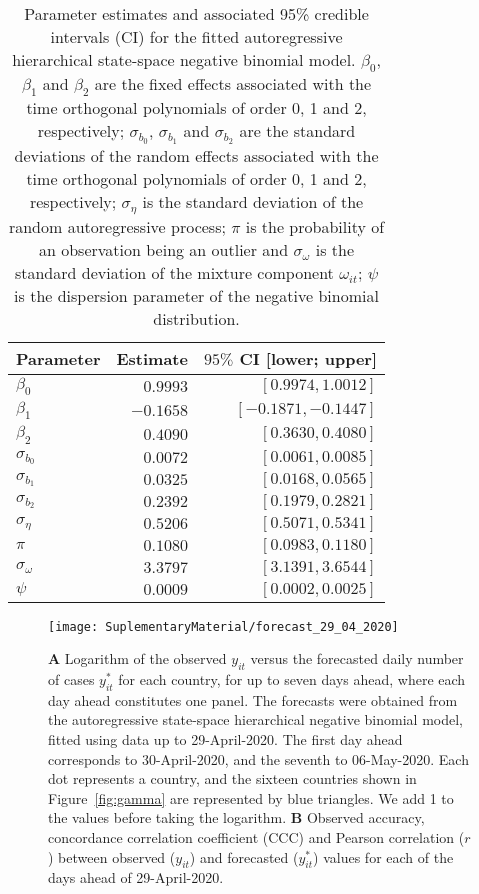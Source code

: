 \documentclass[fleqn,10pt]{wlscirep}
\begin{document}
\begin{table}[ht!]
    \centering
    \begin{tabular}{lrr} \hline
    Parameter & Estimate & $95\%$ CI [lower; upper] \\ \hline
    $\beta_{0}$  & $0.9993$ & $[0.9974, 1.0012]$ \\
    $\beta_{1}$  & $-0.1658$ & $[-0.1871, -0.1447]$ \\
    $\beta_{2}$  & $0.4090$ & $[0.3630, 0.4080]$\\
    $\sigma_{b_{0}}$  & $0.0072$ & $[0.0061, 0.0085]$ \\
    $\sigma_{b_{1}}$  & $0.0325$ & $[0.0168, 0.0565]$ \\
    $\sigma_{b_{2}}$  & $0.2392$ & $[0.1979, 0.2821]$ \\
    $\sigma_{\eta}$ & $0.5206$  & $[0.5071,0.5341]$ \\
    $\pi$ & $0.1080$ & $[0.0983,0.1180]$ \\
    $\sigma_{\omega}$ & $3.3797$ & $[3.1391, 3.6544]$ \\ 
    $\psi$ & $0.0009$ & $[0.0002,0.0025]$ \\ \hline
    \end{tabular}
    \caption{Parameter estimates and associated 95\% credible intervals (CI) for the fitted autoregressive hierarchical state-space negative binomial model. $\beta_0$, $\beta_1$ and $\beta_2$ are the fixed effects associated with the time orthogonal polynomials of order 0, 1 and 2, respectively; $\sigma_{b_0}$, $\sigma_{b_1}$ and $\sigma_{b_2}$ are the standard deviations of the random effects associated with the time orthogonal polynomials of order 0, 1 and 2, respectively; $\sigma_{\eta}$ is the standard deviation of the random autoregressive process; $\pi$ is the probability of an observation being an outlier and $\sigma_{\omega}$ is the standard deviation of the mixture component $\omega_{it}$; $\psi$ is the dispersion parameter of the negative binomial distribution.}
    \label{tab:model}
\end{table}

\begin{figure}[ht!]
    \centering
    \texttt{[image: SuplementaryMaterial/forecast\_29\_04\_2020]}
    \caption{\textbf{A} Logarithm of the observed $y_{it}$ versus the forecasted daily number of cases $y^*_{it}$ for each country, for up to seven days ahead, where each day ahead constitutes one panel. The forecasts were obtained from the autoregressive state-space hierarchical negative binomial model, fitted using data up to 29-April-2020. The first day ahead corresponds to 30-April-2020, and the seventh to 06-May-2020. Each dot represents a country, and the sixteen countries shown in Figure~\ref{fig:gamma} are represented by blue triangles. We add 1 to the values before taking the logarithm. \textbf{B} Observed accuracy, concordance correlation coefficient (CCC) and Pearson correlation ($r$) between observed ($y_{it}$) and forecasted ($y^*_{it}$) values for each of the days ahead of 29-April-2020.}
    \label{fig:forecast1}
\end{figure}
\end{document}
